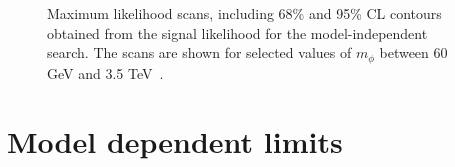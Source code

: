 \begin{figure}[!hbtp]
\caption{Maximum likelihood scans, including 68\% and 95\% CL contours obtained from the signal likelihood for the model-independent search. The scans are shown for selected values of $m_{\phi}$ between 60 GeV and 3.5 TeV~\cite{CMS:2022rbd}.}
\label{fig:2d_likelihood_scans}
\end{figure}

\section{Model dependent limits}

